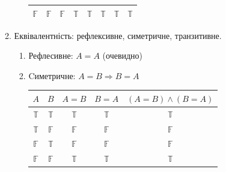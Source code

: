 \documentclass[a4paper,12pt]{article}
\begin{document}
\begin{enumerate}
\begin{enumerate}
\begin{enumerate}
\begin{table}[htp]
\begin{tabular}{|c|c|c|c|c|c|c|c|}
$\mathbb{F}$ & $\mathbb{F}$ & $\mathbb{F}$ & $\mathbb{T}$                         & $\mathbb{T}$                         & $\mathbb{T}$     & $\mathbb{T}$                            & \cellcolor[HTML]{9AFF99}$\mathbb{T}$     \\\hline                   
\end{tabular}
\end{table}
 \end{enumerate} 
\item Еквівалентність: рефлексивне, симетричне, транзитивне.\begin{enumerate}
\item Рефлесивне: $A=A$ (очевидно)\newpage
\item Cиметричне: $A=B\Rightarrow B=A$
\begin{table}[htp]\centering
\begin{tabular}{|c|c|c|c|c|}
\hline
\multicolumn{1}{|c|}{$A$} & \multicolumn{1}{c|}{$B$} & \multicolumn{1}{c|}{$A=B$} & \multicolumn{1}{c|}{$B=A$} & \multicolumn{1}{c|}{$(A=B)\land(B=A)$} \\ \hline
$\mathbb{T}$              & $\mathbb{T}$             & $\mathbb{T}$               & $\mathbb{T}$               & \cellcolor[HTML]{9AFF99}$\mathbb{T}$   \\
$\mathbb{T}$              & $\mathbb{F}$             & $\mathbb{F}$               & $\mathbb{F}$               & $\mathbb{F}$                           \\
$\mathbb{F}$              & $\mathbb{T}$             & $\mathbb{F}$               & $\mathbb{F}$               & $\mathbb{F}$                           \\
$\mathbb{F}$              & $\mathbb{F}$             & $\mathbb{T}$               & $\mathbb{T}$               & \cellcolor[HTML]{9AFF99}$\mathbb{T}$  \\\hline 
\end{tabular}
\end{table}


\end{enumerate}
\end{enumerate}
\end{enumerate}
\end{document}
